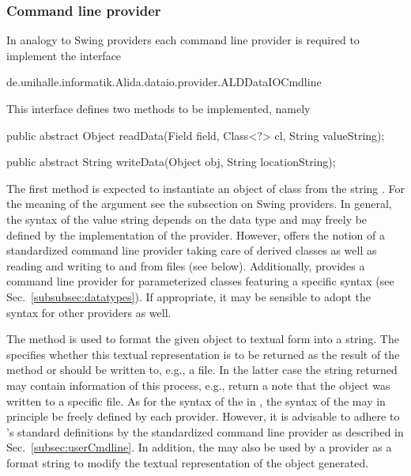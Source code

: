 \subsubsection{Command line provider}
\label{subsubsec:implProviderCmdline}

In analogy to Swing providers each command line provider is required to
implement the interface
\vspace*{0.5cm}
\begin{code}
	de.unihalle.informatik.Alida.dataio.provider.ALDDataIOCmdline
\end{code}

\vspace*{-0.25cm}	
This interface defines two methods to be implemented, namely
\vspace*{0.5cm}
\begin{code}
  public abstract Object readData(Field field, Class<?> cl, String valueString);

  public abstract String writeData(Object obj, String locationString);
\end{code}

\vspace*{-0.25cm}
The first method is expected to instantiate an object of class  from
the string .
For the meaning of the argument  see the subsection
on Swing providers.
In general, the syntax of the value string depends on the data type
and may freely be defined  by the implementation of the provider.
However, \alida offers the notion of a standardized command line provider
taking care of derived classes as  well as reading and writing to and from files
(see below).
Additionally, \alida provides a command line provider for parameterized classes
featuring a specific syntax (see Sec.~\ref{subsubsec:datatypes}).  
If appropriate, it may be sensible to adopt the syntax for other
providers as well.

The method  is used to format the given object to textual
form into a string.
The  specifies whether this textual representation is
to be returned as the result of the method or should be written to, e.g., a
file.
In the latter case the string returned may contain information of this process,
e.g., return a note that the object was written to a specific file.
As for the syntax of  the  in , the
syntax of the    may in principle be freely defined by each
provider.
However, it is advisable to adhere to \alida's standard definitions by the
standardized command line provider as described in
Sec.~\ref{subsec:userCmdline}.
In addition, the  may also be used by a provider as
a format string to modify the textual representation of the object generated.


